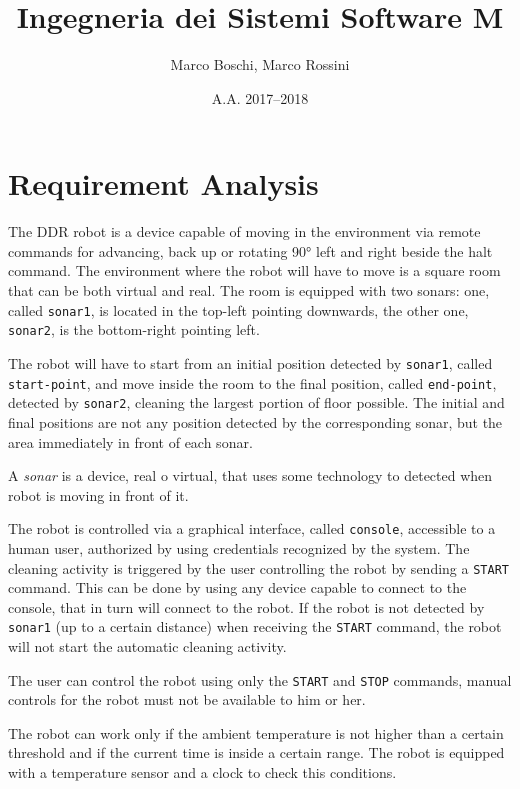

\title{Ingegneria dei Sistemi Software M}
\date{A.A. 2017--2018}
\author{Marco Boschi, Marco Rossini}



\maketitletoc

\section{Requirement Analysis}
The DDR robot is a device capable of moving in the environment via remote commands for advancing, back up or rotating \ang{90} left and right beside the halt command. The environment where the robot will have to move is a square room that can be both virtual and real. The room is equipped with two sonars: one, called \texttt{sonar1}, is located in the top-left pointing downwards, the other one, \texttt{sonar2}, is the bottom-right pointing left.

The robot will have to start from an initial position detected by \texttt{sonar1}, called \texttt{start-point}, and move inside the room to the final position, called \texttt{end-point}, detected by \texttt{sonar2}, cleaning the largest portion of floor possible. The initial and final positions are not any position detected by the corresponding sonar, but the area immediately in front of each sonar.

A \textit{sonar} is a device, real o virtual, that uses some technology to detected when robot is moving in front of it.

The robot is controlled via a graphical interface, called \texttt{console}, accessible to a human user, authorized by using  credentials recognized by the system. The cleaning activity is triggered by the user controlling the robot by sending a \texttt{START} command. This can be done by using any device capable to connect to the console, that in turn will connect to the robot. If the robot is not detected by \texttt{sonar1} (up to a certain distance) when receiving the \texttt{START} command, the robot will not start the automatic cleaning activity.

The user can control the robot using only the \texttt{START} and \texttt{STOP} commands, manual controls for the robot must not be available to him or her.

The robot can work only if the ambient temperature is not higher than a certain threshold and if the current time is inside a certain range. The robot is equipped with a temperature sensor and a clock to check this conditions.

